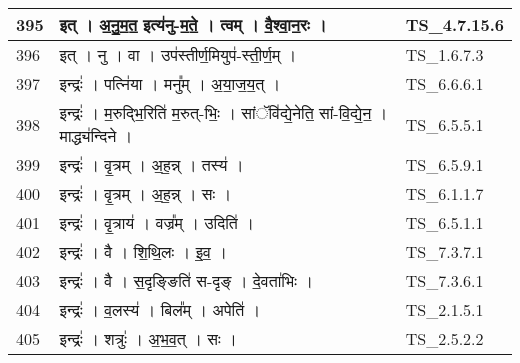 \documentclass[17pt]{extarticle}
\begin{document}
\begin{longtable}{||p{0.4in}||p{4.9in}||p{0.9in}||}
    \hline
        
    395 & इत्   ।   अ॒नु॒म॒त॒ इत्य॑नु{-}म॒ते॒   ।   त्वम्   ।   वै॒श्वा॒न॒रः   ।    & TS\_4.7.15.6       \\
    
    \hline
        
    396 & इत्   ।   नु   ।   वा   ।   उप॑स्तीर्ण॒मियुप॑{-}स्ती॒र्ण॒म्   ।    & TS\_1.6.7.3       \\
    
    \hline
        
    397 & इन्द्रः॑   ।   पत्नि॑या   ।   मनु᳚म्   ।   अ॒या॒ज॒य॒त्   ।    & TS\_6.6.6.1       \\
    
    \hline
        
    398 & इन्द्रः॑   ।   म॒रुद्भि॒रिति॑ म॒रुत्{-}भिः॒   ।   सांॅवि॑द्ये॒नेति॒ सां{-}वि॒द्ये॒न॒   ।   माद्ध्य॑न्दिने   ।    & TS\_6.5.5.1       \\
    
    \hline
        
    399 & इन्द्रः॑   ।   वृ॒त्रम्   ।   अ॒ह॒न्न्   ।   तस्य॑   ।    & TS\_6.5.9.1       \\
    
    \hline
        
    400 & इन्द्रः॑   ।   वृ॒त्रम्   ।   अ॒ह॒न्न्   ।   सः   ।    & TS\_6.1.1.7       \\
    
    \hline
        
    401 & इन्द्रः॑   ।   वृ॒त्राय॑   ।   वज्र᳚म्   ।   उदिति॑   ।    & TS\_6.5.1.1       \\
    
    \hline
        
    402 & इन्द्रः॑   ।   वै   ।   शि॒थि॒लः   ।   इ॒व॒   ।    & TS\_7.3.7.1       \\
    
    \hline
        
    403 & इन्द्रः॑   ।   वै   ।   स॒दृङ्ङिति॑ स{-}दृङ्   ।   दे॒वता॑भिः   ।    & TS\_7.3.6.1       \\
    
    \hline
        
    404 & इन्द्रः॑   ।   व॒लस्य॑   ।   बिल᳚म्   ।   अपेति॑   ।    & TS\_2.1.5.1       \\
    
    \hline
        
    405 & इन्द्रः॑   ।   शत्रुः॑   ।   अ॒भ॒व॒त्   ।   सः   ।    & TS\_2.5.2.2       \\
    

\end{longtable}
\end{document}
